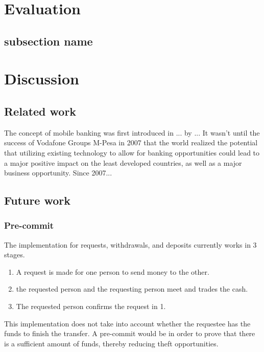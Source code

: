 \documentclass[11pt, a4paper]{article}
\begin{document}
\section{Evaluation}
\subsection{subsection name} %
\label{sub:subsection_name}

\section{Discussion}
\subsection{Related work} %
\label{sub:related_work}
The concept of mobile banking was first introduced in ... by ... It wasn't until the success of Vodafone Groups M-Pesa in 2007 that the world realized the potential that utilizing existing technology to allow for banking opportunities could lead to a major positive impact on the least developed countries, as well as a major business opportunity. Since 2007...


\subsection{Future work} %
\label{sub:future_work}


\subsubsection{Pre-commit} %
\label{sub:pre_commit}
The implementation for requests, withdrawals, and deposits currently works in 3 stages.
\begin{enumerate}
    \item A request is made for one person to send money to the other.
    \item the requested person and the requesting person meet and trades the cash.
    \item The requested person confirms the request in 1.
\end{enumerate}
This implementation does not take into account whether the requestee has the funds to finish the transfer. A pre-commit would be in order to prove that there is a sufficient amount of funds, thereby reducing theft opportunities.
\end{document}
